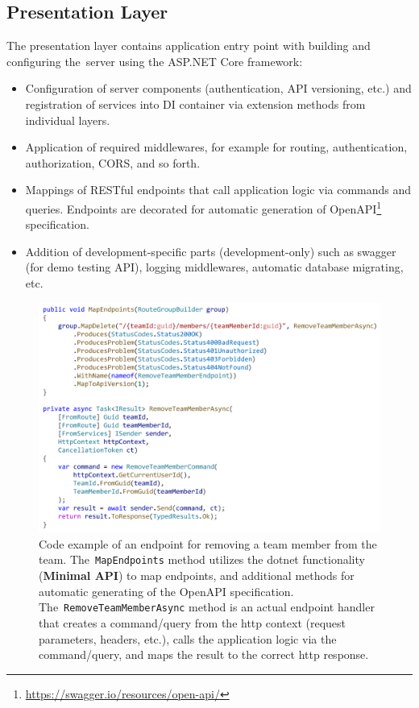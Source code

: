 \subsection{Presentation Layer}
The presentation layer contains application entry point with building and configuring the~server using the ASP.NET Core framework:
\begin{itemize}
    \item Configuration of server components (authentication, API versioning, etc.) and registration of services into DI container via extension methods from individual layers.
    \item Application of required middlewares, for example for routing, authentication, authorization, CORS, and so forth.
    \item Mappings of RESTful endpoints that call application logic via commands and queries. Endpoints are decorated for automatic generation of OpenAPI\footnote{\url{https://swagger.io/resources/open-api/}} specification.
    \item Addition of development-specific parts (development-only) such as swagger (for demo testing API), logging middlewares, automatic database migrating, etc.
\end{itemize}

\begin{figure} [H]
    \centering
    \includegraphics[width=\textwidth]{figures/endpoint.pdf}
    \caption{Code example of an endpoint for removing a team member from the team. The~\texttt{MapEndpoints} method utilizes the dotnet functionality (\textbf{Minimal API}{\protect\footnotemark}) to map endpoints, and additional methods for automatic generating of the OpenAPI specification. The~\texttt{RemoveTeamMemberAsync} method is an actual endpoint handler that creates a command/query from the http context (request parameters, headers, etc.), calls the application logic via the command/query, and maps the result to the correct http response.}
    \label{fig:endpoint}
\end{figure}

